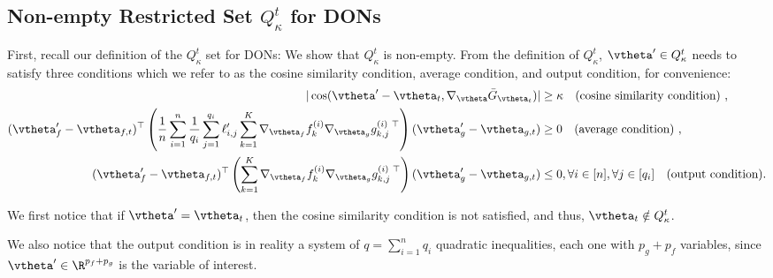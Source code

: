 \subsection{Non-empty Restricted Set $Q^t_{\kappa}$ for DONs}

First, recall our definition of the $Q^t_{\kappa}$ set for DONs:
\qset*
We show that $Q^t_{\kappa}$ is non-empty.
%
\PropQtk*
\proof 
%
From the definition of $Q^t_{\kappa}$, $\vtheta'\in Q^t_{\kappa}$ needs to satisfy three conditions which we refer to as the cosine similarity condition, average condition, and output condition, for convenience:
\begin{align*}
|\cos(\vtheta' - \vtheta_t, \nabla_{\vtheta} \bar{G}_{\vtheta_t})| & \geq \kappa \quad \text{(cosine similarity condition)}~,\\
%
(\vtheta'_f-\vtheta_{f,t})^\top\left(\frac{1}{n} \sum_{i=1}^n \frac{1}{q_i} \sum_{j=1}^{q_i} \ell'_{i,j} \sum_{k=1}^K \nabla_{\vtheta_{f}} f_k^{(i)} \nabla_{\vtheta_{g}} g_{k,j}^{(i)~\top}\right)(\vtheta'_g-\vtheta_{g,t})  &\geq 0\quad \text{(average condition)}~,\\
%
(\vtheta'_f-\vtheta_{f,t})^\top\left( \sum_{k=1}^K \nabla_{\vtheta_{f}} f_k^{(i)} \nabla_{\vtheta_{g}} g_{k,j}^{(i)~\top}\right)(\vtheta'_g-\vtheta_{g,t})&\leq 0,\forall i\in[n],\forall j\in[q_i]
\quad \text{(output condition)}.
\end{align*}

We first notice that if $\vtheta'=\vtheta_t$, then the cosine similarity condition is not satisfied, and thus, $\vtheta_t\notin Q^t_{\kappa}$.

We also notice that the output condition is in reality a system of $q=\sum^n_{i=1}q_i$ quadratic inequalities, each one with $p_g+p_f$ variables, since $\vtheta'\in\R^{p_f+p_g}$ is the variable of interest.

